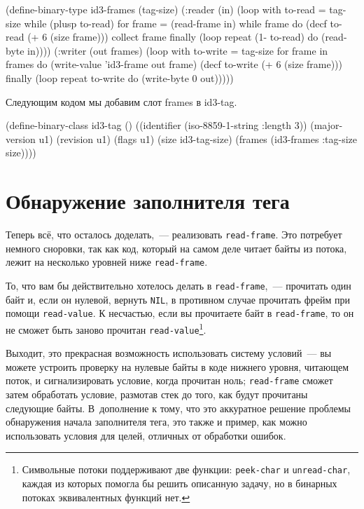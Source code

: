 \begin{myverb}
(define-binary-type id3-frames (tag-size)
  (:reader (in)
    (loop with to-read = tag-size
          while (plusp to-read)
          for frame = (read-frame in)
          while frame
          do (decf to-read (+ 6 (size frame)))
          collect frame
          finally (loop repeat (1- to-read) do (read-byte in))))
  (:writer (out frames)
    (loop with to-write = tag-size
          for frame in frames
          do (write-value 'id3-frame out frame)
          (decf to-write (+ 6 (size frame)))
          finally (loop repeat to-write do (write-byte 0 out)))))
\end{myverb}

Следующим кодом мы добавим слот frames в id3-tag.

\begin{myverb}
(define-binary-class id3-tag ()
  ((identifier     (iso-8859-1-string :length 3))
   (major-version  u1)
   (revision       u1)
   (flags          u1)
   (size           id3-tag-size)
   (frames         (id3-frames :tag-size size))))
\end{myverb}

\section{Обнаружение заполнителя тега}

Теперь всё, что осталось доделать,~--- реализовать \lstinline{read-frame}. Это потребует немного
сноровки, так как код, который на самом деле читает байты из потока, лежит на несколько
уровней ниже \lstinline{read-frame}.

То, что вам бы действительно хотелось делать в \lstinline{read-frame},~--- прочитать один байт и,
если он нулевой, вернуть \lstinline{NIL}, в противном случае прочитать фрейм при помощи
\lstinline{read-value}. К несчастью, если вы прочитаете байт в \lstinline{read-frame}, то он не
сможет быть заново прочитан \lstinline{read-value}\footnote{Символьные потоки поддерживают две
функции: \lstinline{peek-char} и \lstinline{unread-char}, каждая из которых помогла бы решить
описанную задачу, но в бинарных потоках эквивалентных функций нет.}\hspace{\footnotenegspace}.

Выходит, это прекрасная возможность использовать систему условий~--- вы можете устроить
проверку на нулевые байты в коде нижнего уровня, читающем поток, и сигнализировать
условие, когда прочитан ноль; \lstinline{read-frame} сможет затем обработать условие, размотав
стек до того, как будут прочитаны следующие байты. В~дополнение к тому, что это аккуратное
решение проблемы обнаружения начала заполнителя тега, это также и пример, как можно
использовать условия для целей, отличных от обработки ошибок.

